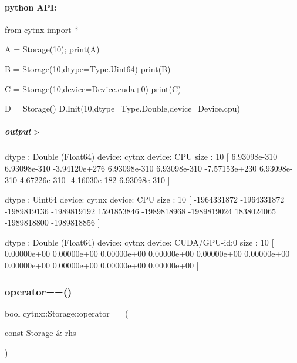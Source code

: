  \paragraph*{python A\+PI\+:}


\begin{DoxyCodeInclude}
\textcolor{keyword}{from} cytnx \textcolor{keyword}{import} *

A = Storage(10);
print(A)

B = Storage(10,dtype=Type.Uint64)
print(B)

C = Storage(10,device=Device.cuda+0)
print(C)

D = Storage()
D.Init(10,dtype=Type.Double,device=Device.cpu)


\end{DoxyCodeInclude}
 \subparagraph*{output$>$}


\begin{DoxyVerbInclude}
dtype : Double (Float64)
device: cytnx device: CPU
size  : 10
[ 6.93098e-310 6.93098e-310 -3.94120e+276 6.93098e-310 6.93098e-310 -7.57153e+230 6.93098e-310 4.67226e-310 -4.16030e-182 6.93098e-310 ]

dtype : Uint64
device: cytnx device: CPU
size  : 10
[         -1964331872         -1964331872         -1989819136         -1989819192          1591853846         -1989818968         -1989819024          1838024065         -1989818800         -1989818856  ]

dtype : Double (Float64)
device: cytnx device: CUDA/GPU-id:0
size  : 10
[ 0.00000e+00 0.00000e+00 0.00000e+00 0.00000e+00 0.00000e+00 0.00000e+00 0.00000e+00 0.00000e+00 0.00000e+00 0.00000e+00 ]




\end{DoxyVerbInclude}
 \mbox{\label{classcytnx_1_1Storage_ad304e00cf3d472ea0355af6b40c4529d}} 
\subsubsection{\texorpdfstring{operator==()}{operator==()}}
{\footnotesize\ttfamily bool cytnx\+::\+Storage\+::operator== (\begin{DoxyParamCaption}\item[{const \hyperlink{classcytnx_1_1Storage}{Storage} \&}]{rhs }\end{DoxyParamCaption})}




